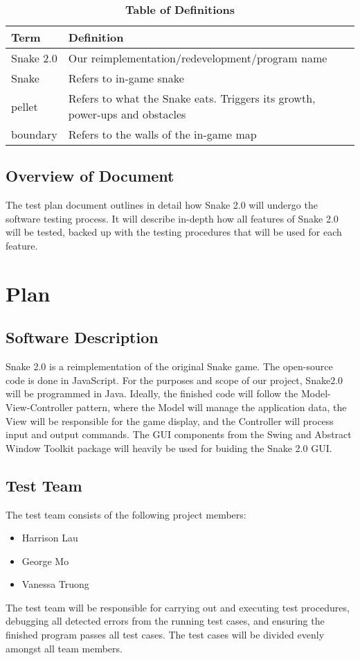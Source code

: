 \documentclass[12pt, titlepage]{article}
\begin{document}
\begin{table}[!htbp]
\caption{\textbf{Table of Definitions}} \label{Table}

\begin{tabularx}{\textwidth}{p{3cm}X}
\toprule
\textbf{Term} & \textbf{Definition}\\
\midrule
Snake 2.0 & Our reimplementation/redevelopment/program  name\\
Snake & Refers to in-game snake\\
pellet & Refers to what the Snake eats. Triggers its growth, power-ups and obstacles\\
boundary & Refers to the walls of the in-game map\\
\bottomrule
\end{tabularx}

\end{table}	

\subsection{Overview of Document}
The test plan document outlines in detail how Snake 2.0 will undergo the software testing process. It will describe in-depth how all features of Snake 2.0 will be tested, backed up with the testing procedures that will be used for each feature.
 
\section{Plan} 	
\subsection{Software Description}
Snake 2.0 is a reimplementation of the original Snake game. The open-source code is done in JavaScript. For the purposes and scope of our project, Snake2.0 will be programmed in Java. Ideally, the finished code will follow the Model-View-Controller pattern, where the Model will manage the application data, the View will be responsible for the game display, and the Controller will process input and output commands. The GUI components from the Swing and Abstract Window Toolkit package will heavily be used for buiding the Snake 2.0 GUI. 

\subsection{Test Team}
The test team consists of the following project members:
\begin{itemize}
\item Harrison Lau
\item George Mo
\item Vanessa Truong
\end{itemize}
The test team will be responsible for carrying out and executing test procedures, debugging all detected errors from the running test cases, and ensuring the finished program passes all test cases. The test cases will be divided evenly amongst all team members.
\end{document}
